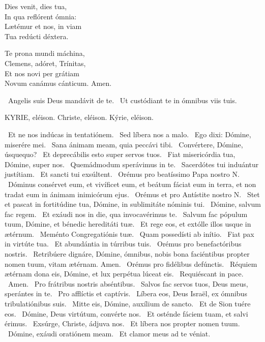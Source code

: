 Dies venit, dies tua,\\
In qua reflórent ómnia:\\
Lætémur et nos, in viam\\
Tua redúcti déxtera.

Te prona mundi máchina,\\
Clemens, adóret, Trínitas,\\
Et nos novi per grátiam\\
Novum canámus cánticum. Amen.

\V\ Angelis suis Deus mandávit de te. \R\ Ut custódiant te in ómnibus viis tuis.




KYRIE, eléison. Christe, eléison. Kýrie, eléison.

 \V\ Et ne nos indúcas in tentatiónem. \R\ Sed líbera nos a malo. \V\ Ego dixi: Dómine, miserére mei. \R\ Sana ánimam meam, quia peccávi tibi. \V\ Convértere, Dómine, úsquequo? \R\ Et deprecábilis esto super servos tuos. \V\ Fiat misericórdia tua, Dómine, super nos. \R\ Quemádmodum sperávimus in te. \V\ Sacerdótes tui induántur justítiam. \R\ Et sancti tui exsúltent. \V\ Orémus pro beatíssimo Papa nostro N. \R\ Dóminus consérvet eum, et vivíficet eum, et beátum fáciat eum in terra, et non tradat eum in ánimam inimicórum ejus. \V\ Orémus et pro Antístite nostro N. \R\ Stet et pascat in fortitúdine tua, Dómine, in sublimitáte nóminis tui. \V\ Dómine, salvum fac regem. \R\ Et exáudi nos in die, qua invocavérimus te. \V\ Salvum fac pópulum tuum, Dómine, et bénedic hereditáti tuæ. \R\ Et rege eos, et extólle illos usque in ætérnum. \V\ Meménto Congregatiónis tuæ. \R\ Quam possedísti ab inítio. \V\ Fiat pax in virtúte tua. \R\ Et abundántia in túrribus tuis. \V\ Orémus pro benefactóribus nostris. \R\ Retribúere dignáre, Dómine, ómnibus, nobis bona faciéntibus propter nomen tuum, vitam ætérnam. Amen. \V\ Orémus pro fidélibus defúnctis. \R\ Réquiem ætérnam dona eis, Dómine, et lux perpétua lúceat eis. \V\ Requiéscant in pace. \R\ Amen. \V\ Pro frátribus nostris abséntibus. \R\ Salvos fac servos tuos, Deus meus, sperántes in te. \V\ Pro afflíctis et captívis. \R\ Líbera eos, Deus Israël, ex ómnibus tribulatiónibus suis. \V\ Mitte eis, Dómine, auxílium de sancto. \R\ Et de Sion tuére eos. \V\ Dómine, Deus virtútum, convérte nos. \R\ Et osténde fáciem tuam, et salvi érimus. \V\ Exsúrge, Christe, ádjuva nos. \R\ Et líbera nos propter nomen tuum. \V\ Dómine, exáudi oratiónem meam. \R\ Et clamor meus ad te véniat.

